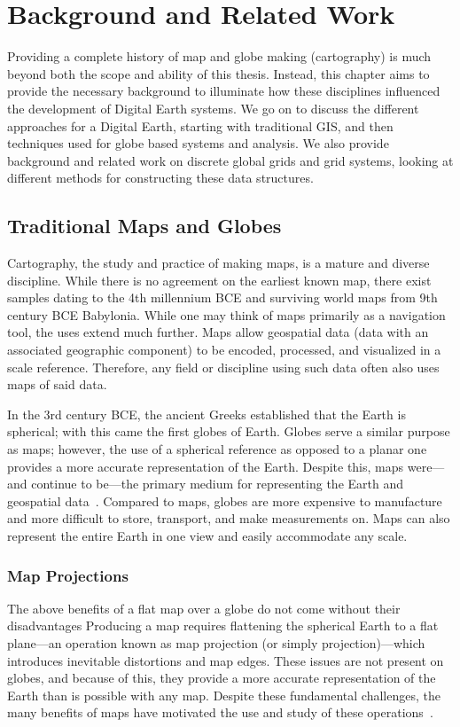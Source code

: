 \chapter{Background and Related Work} \label{chap:background}
Providing a complete history of map and globe making (cartography) is much beyond both the scope and ability of this thesis.
Instead, this chapter aims to provide the necessary background to illuminate how these disciplines influenced the development of Digital Earth systems.
We go on to discuss the different approaches for a Digital Earth, starting with traditional GIS, and then techniques used for globe based systems and analysis.
We also provide background and related work on discrete global grids and grid systems, looking at different methods for constructing these data structures.


\section{Traditional Maps and Globes} \label{chap:2:maps}
Cartography, the study and practice of making maps, is a mature and diverse discipline.
While there is no agreement on the earliest known map, there exist samples dating to the 4th millennium BCE and surviving world maps from 9th century BCE Babylonia.
While one may think of maps primarily as a navigation tool, the uses extend much further.
Maps allow geospatial data (data with an associated geographic component) to be encoded, processed, and visualized in a scale reference.
Therefore, any field or discipline using such data often also uses maps of said data.


In the 3rd century BCE, the ancient Greeks established that the Earth is spherical; with this came the first globes of Earth.
Globes serve a similar purpose as maps; however, the use of a spherical reference as opposed to a planar one provides a more accurate representation of the Earth.
Despite this, maps were---and continue to be---the primary medium for representing the Earth and geospatial data~\cite{hruby20182000}.
Compared to maps, globes are more expensive to manufacture and more difficult to store, transport, and make measurements on.
Maps can also represent the entire Earth in one view and easily accommodate any scale.


\subsection{Map Projections} \label{chap:2:projection}
The above benefits of a flat map over a globe do not come without their disadvantages
Producing a map requires flattening the spherical Earth to a flat plane---an operation known as map projection (or simply projection)---which introduces inevitable distortions and map edges.
These issues are not present on globes, and because of this, they provide a more accurate representation of the Earth than is possible with any map.
Despite these fundamental challenges, the many benefits of maps have motivated the use and study of these operations~\cite{snyder1987map, snyder1997flattening}.


